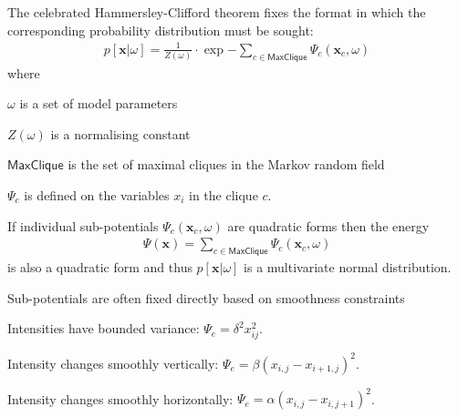 \documentclass[landscape,footrule]{foils}
\renewcommand{\vec}[1]{\boldsymbol{#1}}
\begin{document}




The celebrated Hammersley-Clifford theorem fixes the format in which the corresponding probability distribution must be sought:
\begin{align*}
p[\vec{x}|\omega]=\frac{1}{Z(\omega)}\cdot\exp{-\sum_{c\in\textsf{MaxClique}}\Psi_c(\vec{x}_c,\omega)} 
\end{align*} 
where 
\begin{triangles}
\item $\omega$ is a set of model parameters
\item $Z(\omega)$ is a normalising constant
\item $\textsf{MaxClique}$ is the set of maximal cliques in the Markov random field
\item $\Psi_c$ is defined on the variables $x_i$ in the clique $c$. 
\end{triangles}


If individual sub-potentials $\Psi_c(\vec{x}_c,\omega)$ are quadratic forms then the energy 
\begin{align*}
\Psi(\vec{x})=\sum_{c\in\textsf{MaxClique}}\Psi_c(\vec{x}_c,\omega) 
\end{align*} 
is also a quadratic form and thus $p[\vec{x}|\omega]$ is a multivariate normal distribution.\vspace*{1cm}

Sub-potentials are often fixed directly based on smoothness constraints
\begin{triangles}
\item Intensities have bounded variance: $\Psi_e=\delta^2 x_{ij}^2$. 
\item Intensity changes smoothly vertically: $\Psi_e=\beta(x_{i,j}-x_{i+1,j})^2$.
\item Intensity changes smoothly horizontally: $\Psi_e=\alpha(x_{i,j}-x_{i,j+1})^2$.
\end{triangles} 


\vspace*{-0.6cm}
\end{document}
